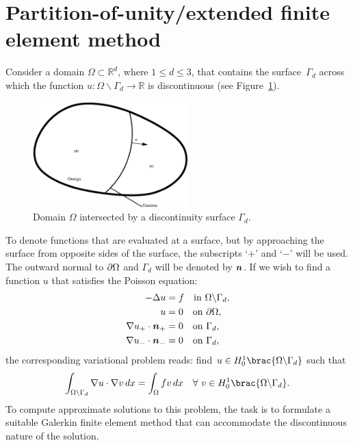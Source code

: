 \section{Partition-of-unity/extended finite element method}
%
Consider a domain $\Omega \subset \mathbb{R}^{d}$, where $1 \leq d \leq 3$,
that contains the surface~$\Gamma_{d}$ across which the function $u:
\Omega\backslash \Gamma_{d} \rightarrow \mathbb{R}$ is discontinuous
(see Figure~\ref{nikbakht:fig:domain}).
%
\begin{figure}
\begin{center}
  \includegraphics[width=6cm]{chapters/nikbakht/pdf/domain.pdf}
\end{center}
\caption{Domain $\Omega$ intersected by a discontinuity surface $\Gamma_{d}$.}
\label{nikbakht:fig:domain}
\end{figure}
%
To denote functions that are evaluated at a surface, but by approaching
the surface from opposite sides of the surface, the subscripts `$+$' and
`$-$' will be used. The outward normal to $\partial \Omega$ and $\Gamma_{d}$
will be denoted by $\boldsymbol{n}$.
If we wish to find a function $u$ that satisfies
the Poisson equation:
%
\begin{align}
  - \Delta u &= f \quad {\rm in} \ \Omega \backslash \Gamma_{d}, \\
           u &= 0 \quad {\rm on} \ \pd\Omega, \\
  \nabla u_{+} \cdot \vect{n}_{+} &= 0 \quad {\rm on} \ \Gamma_{d},\\
  \nabla u_{-} \cdot \vect{n}_{-} &= 0 \quad {\rm on} \ \Gamma_{d},
\end{align}
%
the corresponding variational problem reads:
find $u \in H_{0}^{1}\brac{\Omega\backslash\Gamma_{d}}$ such that
%
\begin{equation}
  \int_{\Omega\backslash\Gamma_{d}}  \nabla u \cdot \nabla v \dif x
      = \int_{\Omega} f v \dif x
\quad \forall \ v \in H_{0}^{1}\brac{\Omega\backslash\Gamma_{d}}.
\label{nikbakht:eqn:poisson_discontinuous_variational}
\end{equation}
%
To compute approximate solutions to this problem, the task is to formulate
a suitable Galerkin finite element method that can accommodate the
discontinuous nature of the solution.

